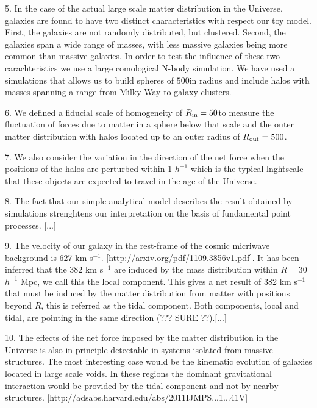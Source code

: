 \documentclass{article}
\newcommand{\hMpc}{{\ifmmode{h^{-1}{\rm Mpc}}\else{$h^{-1}$Mpc }\fi}}
\begin{document}
5. In the case of the actual large scale matter distribution in the
Universe, galaxies are found to have two distinct characteristics with
respect our toy model. First, the galaxies are not randomly
distributed, but clustered. Second, the galaxies span a wide range of
masses, with less massive galaxies being more common than massive
galaxies. In order to test the influence of these two carachteristics
we use a large comological N-body simulation. We have used a
simulations that allows us to build spheres of $500$\hMpc in radius
and include halos with masses spanning a range from Milky Way to
galaxy clusters.

6. We defined a fiducial scale of homogeneity of $R_{\rm in }=50$\hMpc to
measure the fluctuation of forces due to matter in a sphere below that
scale and the outer matter distribution with halos located up to an
outer radius of $R_{\rm out}=500$\hMpc. 


7. We also consider the variation in the direction of the net force
when the positions of the halos are perturbed within 1 $h^{-1}$ which
is the typical lnghtscale that these objects are expected to travel in
the age of the Universe.




8. The fact that our simple analytical model describes the result
obtained by simulations strenghtens our interpretation on the basis of
fundamental point processes. [...]

9. The velocity of our galaxy in the rest-frame of the cosmic
micriwave background is 627 km
s$^{-1}$. [http://arxiv.org/pdf/1109.3856v1.pdf]. It has been inferred
that the $382$ km s$^{-1}$ are induced by the mass distribution within
$R=30$ $h^{-1}$ Mpc, we call this the local component. This gives a
net result of 382 km s$^{-1}$ that must be induced by the matter
distribution from matter with positions beyond $R$, this is referred
as the tidal component.  Both components, local and tidal, are
pointing in the same direction (??? SURE ??).[...]

10. The effects of the net force imposed by the matter distribution
in the Universe is also in principle detectable in systems isolated 
from massive structures. The most interesting case would be the
kinematic evolution of galaxies located in large scale voids. In these
regions the dominant gravitational interaction would be provided by
the tidal component and not by nearby
structures. [http://adsabs.harvard.edu/abs/2011IJMPS...1...41V] 
\end{document}
